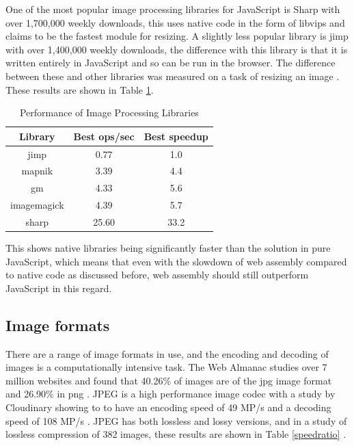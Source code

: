 \documentclass[12pt,a4paper]{article}
\begin{document}
One of the most popular image processing libraries for JavaScript is Sharp with over 1,700,000 weekly downloads, this uses native code in the form of libvips and claims to be the fastest module for resizing. A slightly less popular library is jimp with over 1,400,000 weekly downloads, the difference with this library is that it is written entirely in JavaScript and so can be run in the browser. The difference between these and other libraries was measured on a task of resizing an image \cite{sharp}. These results are shown in Table \ref{imgproc}.

\begin{table}[htb]
    \centering
    \caption{Performance of Image Processing Libraries}
    \vspace*{6pt}
    \label{imgproc}
    \begin{tabular}{ccc}\hline\hline
        Library     & Best ops/sec & Best speedup \\ \hline
        jimp        & 0.77         & 1.0          \\
        mapnik      & 3.39         & 4.4          \\
        gm          & 4.33         & 5.6          \\
        imagemagick & 4.39         & 5.7          \\
        sharp       & 25.60        & 33.2
    \end{tabular}
\end{table}


This shows native libraries being significantly faster than the solution in pure JavaScript, which means that even with the slowdown of web assembly compared to native code as discussed before, web assembly should still outperform JavaScript in this regard.

\subsection{Image formats}

There are a range of image formats in use, and the encoding and decoding of images is a computationally intensive task. The Web Almanac studies over 7 million websites and found that 40.26\% of images are of the jpg image format and 26.90\% in png \cite{webalmanac}. JPEG is a high performance image codec with a study by Cloudinary showing to to have an encoding speed of 49 MP/s and a decoding speed of 108 MP/s \cite{cloudinary}. JPEG has both lossless and lossy versions, and in a study of lossless compression of 382 images, these results are shown in Table \ref{speedratio} \cite{ukrit2011survey}.
\end{document}
